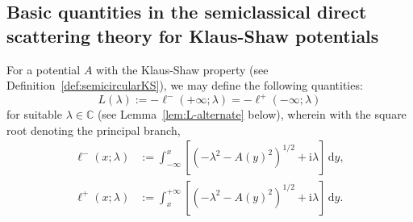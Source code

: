\documentclass[12pt]{amsart}
\numberwithin{equation}{section}
\newcommand{\dd}{\mathrm{d}}
\newcommand{\ii}{\mathrm{i}}
\newcommand{\SP}{\lambda}
\newcommand{\C}{\mathbb{C}}
\begin{document}
\subsection{Basic quantities in the semiclassical direct scattering theory for Klaus-Shaw potentials}
\label{sec:basic-quantities}
For a potential $A$ with the Klaus-Shaw property (see Definition~\ref{def:semicircularKS}), we may define the following quantities:
\begin{equation}
L(\SP):=-\ell^-(+\infty;\SP)=-\ell^+(-\infty;\SP)
\label{eq:Lfunc-def}
\end{equation}
for suitable $\SP\in\C$ (see Lemma~\ref{lem:L-alternate} below), wherein with the square root denoting the principal branch,
\begin{equation}
\begin{split}
\ell^-(x;\SP)&:=\int_{-\infty}^x\left[\left(-\SP^2-A(y)^2\right)^{1/2}+\ii\SP\right]\,\dd y,\\
\ell^+(x;\SP)&:=\int_x^{+\infty}\left[\left(-\SP^2-A(y)^2\right)^{1/2}+\ii\SP\right]\,\dd y.
\end{split}
\label{eq:mu-plus-minus-define}
\end{equation}
\end{document}
